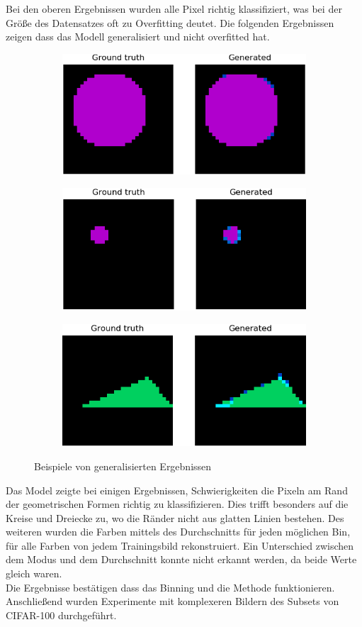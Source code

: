 Bei den oberen Ergebnissen wurden alle Pixel richtig klassifiziert, was bei der Größe des Datensatzes oft zu Overfitting deutet.
Die folgenden Ergebnissen zeigen dass das Modell generalisiert und nicht overfitted hat.

\begin{figure}[H]
  \vspace{1cm}
  \begin{subfigure}
    \centering
    \includegraphics[width=.32\textwidth]{resources/experiments/581.png}
  \end{subfigure}
  \begin{subfigure}
    \centering
    \includegraphics[width=.32\textwidth]{resources/experiments/712.png}
  \end{subfigure}
  \begin{subfigure}
    \centering
    \includegraphics[width=.32\textwidth]{resources/experiments/761.png}
  \end{subfigure}
  \caption{Beispiele von generalisierten Ergebnissen}
  \label{image:nicht-gute-ergebnisse-toy-dataset}
\end{figure}

Das Model zeigte bei einigen Ergebnissen, Schwierigkeiten die Pixeln am Rand der geometrischen Formen richtig zu klassifizieren.
Dies trifft besonders auf die Kreise und Dreiecke zu, wo die Ränder nicht aus glatten Linien bestehen. Des weiteren wurden die Farben mittels
des Durchschnitts für jeden möglichen Bin, für alle Farben von jedem Trainingsbild rekonstruiert. Ein Unterschied zwischen dem Modus und dem 
Durchschnitt konnte nicht erkannt werden, da beide Werte gleich waren.
\\
Die Ergebnisse bestätigen dass das Binning und die Methode funktionieren. Anschließend wurden Experimente mit komplexeren Bildern
des Subsets von CIFAR-100 durchgeführt.

